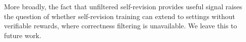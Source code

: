 
More broadly, the fact that unfiltered self-revision provides useful signal raises the question of whether self-revision training can extend to settings without verifiable rewards, where correctness filtering is unavailable. We leave this to future work.
 
